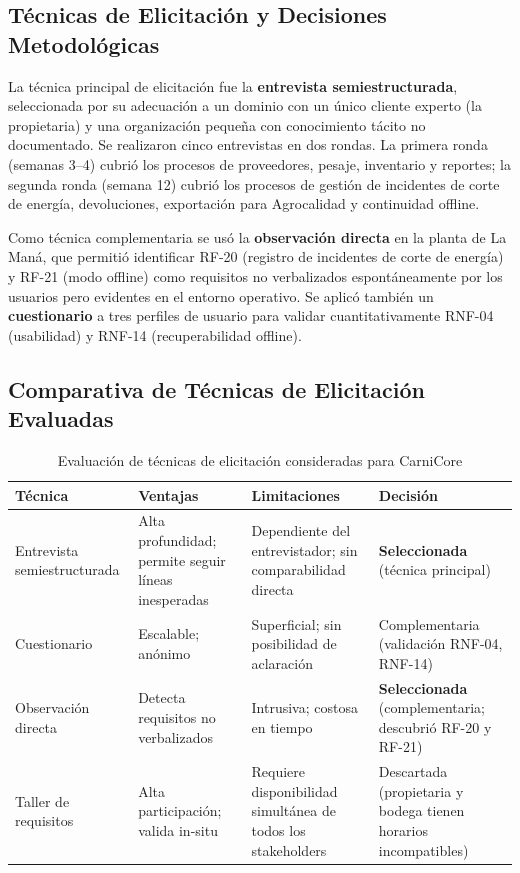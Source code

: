 \documentclass[11pt,a4paper]{article}
\begin{document}
\subsection{Técnicas de Elicitación y Decisiones Metodológicas}

La técnica principal de elicitación fue la \textbf{entrevista semiestructurada}, seleccionada por su adecuación a un dominio con un único cliente experto (la propietaria) y una organización pequeña con conocimiento tácito no documentado. Se realizaron cinco entrevistas en dos rondas. La primera ronda (semanas 3--4) cubrió los procesos de proveedores, pesaje, inventario y reportes; la segunda ronda (semana 12) cubrió los procesos de gestión de incidentes de corte de energía, devoluciones, exportación para Agrocalidad y continuidad offline.

Como técnica complementaria se usó la \textbf{observación directa} en la planta de La Maná, que permitió identificar RF-20 (registro de incidentes de corte de energía) y RF-21 (modo offline) como requisitos no verbalizados espontáneamente por los usuarios pero evidentes en el entorno operativo. Se aplicó también un \textbf{cuestionario} a tres perfiles de usuario para validar cuantitativamente RNF-04 (usabilidad) y RNF-14 (recuperabilidad offline).

\subsection{Comparativa de Técnicas de Elicitación Evaluadas}

\begin{table}[H]
\centering
\begin{tabular}{|p{3cm}|p{3cm}|p{3cm}|p{4cm}|}
\hline
\textbf{Técnica} & \textbf{Ventajas} & \textbf{Limitaciones} & \textbf{Decisión} \\
\hline
Entrevista semiestructurada & Alta profundidad; permite seguir líneas inesperadas & Dependiente del entrevistador; sin comparabilidad directa & \textbf{Seleccionada} (técnica principal) \\
\hline
Cuestionario & Escalable; anónimo & Superficial; sin posibilidad de aclaración & Complementaria (validación RNF-04, RNF-14) \\
\hline
Observación directa & Detecta requisitos no verbalizados & Intrusiva; costosa en tiempo & \textbf{Seleccionada} (complementaria; descubrió RF-20 y RF-21) \\
\hline
Taller de requisitos & Alta participación; valida in-situ & Requiere disponibilidad simultánea de todos los stakeholders & Descartada (propietaria y bodega tienen horarios incompatibles) \\
\hline
\end{tabular}
\caption{Evaluación de técnicas de elicitación consideradas para CarniCore}
\label{tab:tecnicas}
\end{table}
\end{document}
